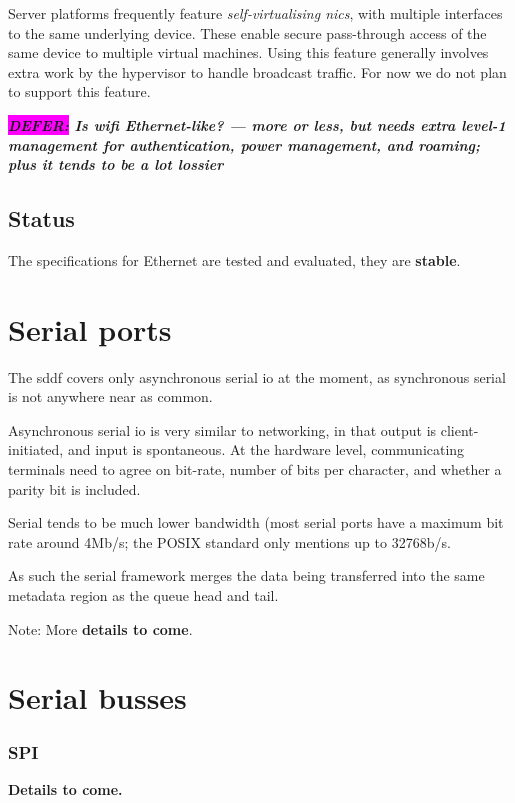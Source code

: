 \documentclass[a4paper,12pt]{report}
\newcommand{\DEFER}[1]{\textbf{\textsl{\colorbox{magenta}{DEFER:} #1}}}
\newcommand{\DEFER}[1]{\relax}
\newcommand{\ToCome}[1]{\textbf{#1 to come.}}
\begin{document}
Server platforms frequently feature \emph{self-virtualising
  \glspl{nic}}, with multiple interfaces to the same underlying
device. These enable secure pass-through access of the same device to
multiple virtual machines.  Using this feature generally involves
extra work by the hypervisor to handle broadcast traffic. For now we
do not plan to support this feature.

\DEFER{Is wifi Ethernet-like? --- more or less, but needs extra
  level-1 management for authentication, power management, and
  roaming; plus it tends to be a lot lossier}

\subsection{Status}

The specifications for Ethernet are tested and evaluated, they are
\textbf{stable}.

\section{Serial ports}\label{s:cl-serial}

The \gls{sddf} covers only asynchronous serial \gls{io} at the moment, as
synchronous serial is not anywhere near as common.

Asynchronous serial \gls{io} is very similar to networking, in that output is
client-initiated, and input is spontaneous.  At the hardware level,
communicating terminals need to agree on bit-rate, number of bits per
character, and whether a parity bit is included.

Serial tends to be much lower bandwidth (most serial ports have a
maximum bit rate around 4Mb/s; the POSIX standard only mentions up to
32768b/s.

As such the serial framework merges the data being transferred into
the same metadata region as the queue head and tail.

Note: More \textbf{details to come}.


\section{Serial busses}\label{s:cl-bus}

\subsubsection{SPI}\label{s:cl-spi}

\ToCome{Details}
\end{document}

